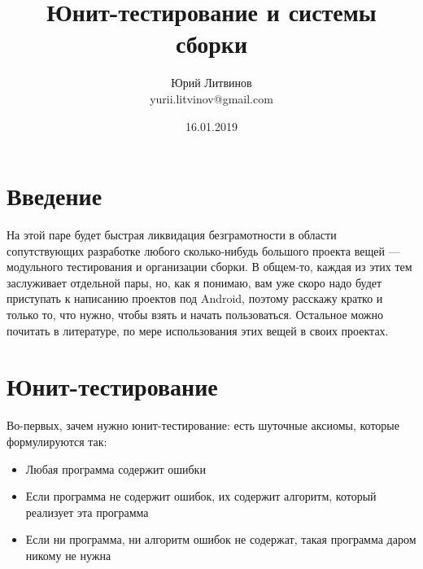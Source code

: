 \documentclass[a5paper]{article}
\title{Юнит-тестирование и системы сборки}
\author{Юрий Литвинов\\\small{yurii.litvinov@gmail.com}}
\date{16.01.2019}
\begin{document}
\maketitle
\thispagestyle{empty}

\section{Введение}

На этой паре будет быстрая ликвидация безграмотности в области сопутствующих разработке любого сколько-нибудь большого проекта вещей --- модульного тестирования и организации сборки. В общем-то, каждая из этих тем заслуживает отдельной пары, но, как я понимаю, вам уже скоро надо будет приступать к написанию проектов под Android, поэтому расскажу кратко и только то, что нужно, чтобы взять и начать пользоваться. Остальное можно почитать в литературе, по мере использования этих вещей в своих проектах.

\section{Юнит-тестирование}

Во-первых, зачем нужно юнит-тестирование: есть шуточные аксиомы, которые формулируются так:
\begin{itemize}
	\item Любая программа содержит ошибки
	\item Если программа не содержит ошибок, их содержит алгоритм, который реализует эта программа
	\item Если ни программа, ни алгоритм ошибок не содержат, такая программа даром никому не нужна
\end{itemize}
\end{document}
